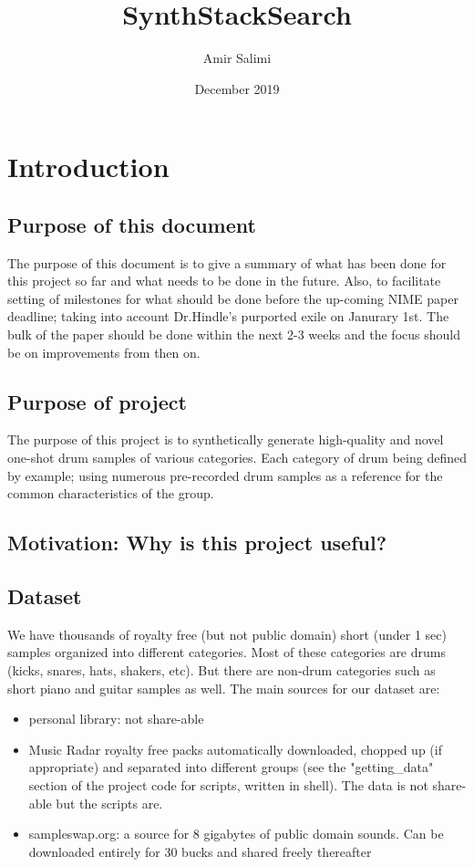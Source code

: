 \documentclass{article}
\title{SynthStackSearch}
\author{Amir Salimi}
\date{December 2019}
\begin{document}
\maketitle

\section{Introduction}
\subsection{Purpose of this document}
The purpose of this document is to give a summary of what has been done for this project so far and what needs to be done in the future. Also, to facilitate setting of milestones for what should be done before the up-coming NIME paper deadline; taking into account Dr.Hindle's purported exile on Janurary 1st. The bulk of the paper should be done within the next 2-3 weeks and the focus should be on improvements from then on. 
\subsection{Purpose of project}
The purpose of this project is to synthetically generate high-quality and novel one-shot drum samples of various categories. Each category of drum being defined by example; using numerous pre-recorded drum samples as a reference for the common characteristics of the group. 

\subsection{Motivation: Why is this project useful?}

\subsection{Dataset}
We have thousands of royalty free (but not public domain) short (under 1 sec) samples organized into different categories. Most of these categories are drums (kicks, snares, hats, shakers, etc). But there are non-drum categories such as short piano and guitar samples as well. The main sources for our dataset are:
\begin{itemize}
    \item personal library: not share-able
    \item Music Radar royalty free packs automatically downloaded, chopped up (if appropriate) and separated into different groups (see the "getting\_data" section of the project code for scripts, written in shell). The data is not share-able but the scripts are.
    \item  sampleswap.org: a source for 8 gigabytes of public domain sounds. Can be downloaded entirely for 30 bucks and shared freely thereafter
\end{itemize}
\end{document}
